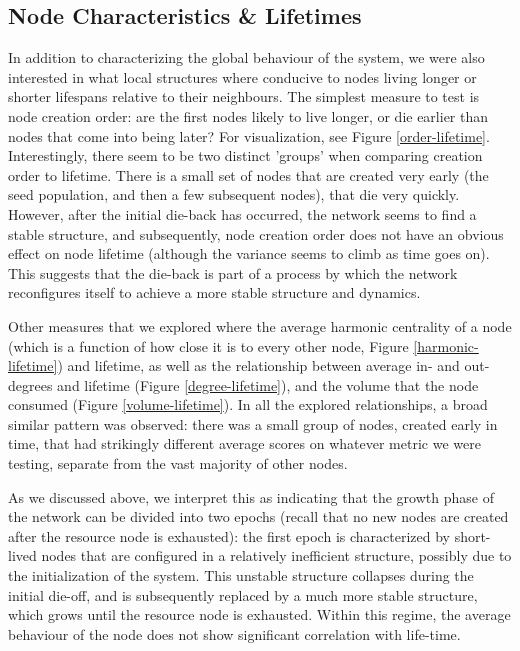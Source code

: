 \documentclass{paper}
\begin{document}
	\subsection{Node Characteristics \& Lifetimes}
	In addition to characterizing the global behaviour of the system, we were also interested in what local structures where conducive to nodes living longer or shorter lifespans relative to their neighbours. The simplest measure to test is node creation order: are the first nodes likely to live longer, or die earlier than nodes that come into being later? For visualization, see Figure \ref{order-lifetime}. Interestingly, there seem to be two distinct 'groups' when comparing creation order to lifetime. There is a small set of nodes that are created very early (the seed population, and then a few subsequent nodes), that die very quickly. However, after the initial die-back has occurred, the network seems to find a stable structure, and subsequently, node creation order does not have an obvious effect on node lifetime (although the variance seems to climb as time goes on). This suggests that the die-back is part of a process by which the network reconfigures itself to achieve a more stable structure and dynamics. 
	
	Other measures that we explored where the average harmonic centrality of a node (which is a function of how close it is to every other node, Figure \ref{harmonic-lifetime}) and lifetime, as well as the relationship between average in- and out-degrees and lifetime (Figure \ref{degree-lifetime}), and the volume that the node consumed (Figure \ref{volume-lifetime}). In all the explored relationships, a broad similar pattern was observed: there was a small group of nodes, created early in time, that had strikingly different average scores on whatever metric we were testing, separate from the vast majority of other nodes. 
	
	As we discussed above, we interpret this as indicating that the growth phase of the network can be divided into two epochs (recall that no new nodes are created after the resource node is exhausted): the first epoch is characterized by short-lived nodes that are configured in a relatively inefficient structure, possibly due to the initialization of the system. This unstable structure collapses during the initial die-off, and is subsequently replaced by a much more stable structure, which grows until the resource node is exhausted. Within this regime, the average behaviour of the node does not show significant correlation with life-time. 
	
\end{document}
